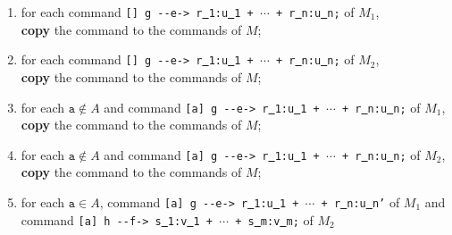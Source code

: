 \documentclass{article}
\newcommand{\arci}[1]{{-}{-}{#1}->}
\renewcommand{\_}{\underline{~}}
\newcommand{\code}[1]{\texttt{#1}}
\begin{document}
\begin{enumerate}
	\item for each command \code{[] g \arci{e} r\_1:u\_1 + $\cdots$ + r\_n:u\_n;} of $M_1$, \\ 
	\textbf{copy} the command to the commands of $M$;
	
	\item for each command \code{[] g \arci{e} r\_1:u\_1 + $\cdots$ + r\_n:u\_n;} of $M_2$, \\ 
	\textbf{copy} the command to the commands of $M$;

	\item for each $\code{a} \not\in A$ and command \code{[a] g \arci{e}  r\_1:u\_1 + $\cdots$ + r\_n:u\_n;} of $M_1$, \\ 
	\textbf{copy} the command to the commands of $M$;

	\item for each $\code{a} \not\in A$ and command \code{[a] g \arci{e}  r\_1:u\_1 + $\cdots$ + r\_n:u\_n;} of $M_2$, \\ 
	\textbf{copy} the command to the commands of $M$;


	\item for each $\code{a} \in A$, command \code{[a] g \arci{e} r\_1:u\_1 + $\cdots$ + r\_n:u\_n'} of $M_1$ and \\command \code{[a]  h \arci{f} s\_1:v\_1 + $\cdots$ + s\_m:v\_m;} of $M_2$ 
	\begin{itemize}
		

\end{itemize}
\end{enumerate}
\end{document}
